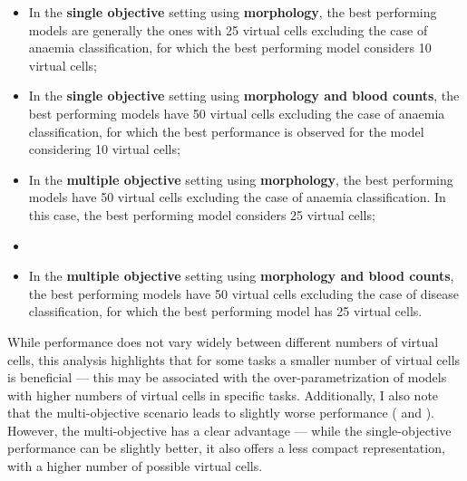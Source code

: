 \begin{itemize}
    \item In the \textbf{single objective} setting using \textbf{morphology}, the best performing models are generally the ones with 25 virtual cells excluding the case of anaemia classification, for which the best performing model considers 10 virtual cells;
    \item In the \textbf{single objective} setting using \textbf{morphology and blood counts}, the best performing models have 50 virtual cells excluding the case of anaemia classification, for which the best performance is observed for the model considering 10 virtual cells;
    \item In the \textbf{multiple objective} setting using \textbf{morphology}, the best performing models have 50 virtual cells excluding the case of anaemia classification. In this case, the best performing model considers 25 virtual cells;
    \item \item In the \textbf{multiple objective} setting using \textbf{morphology and blood counts}, the best performing models have 50 virtual cells excluding the case of disease classification, for which the best performing model has 25 virtual cells.
\end{itemize}

\begin{figure}[!ht]
    \label{fig:mile-vice-performance}
\end{figure}

While performance does not vary widely between different numbers of virtual cells, this analysis highlights that for some tasks a smaller number of virtual cells is beneficial --- this may be associated with the over-parametrization of models with higher numbers of virtual cells in specific tasks. Additionally, I also note that the multi-objective scenario leads to slightly worse performance ( and ). However, the multi-objective has a clear advantage --- while the single-objective performance can be slightly better, it also offers a less compact representation, with a higher number of possible virtual cells.

